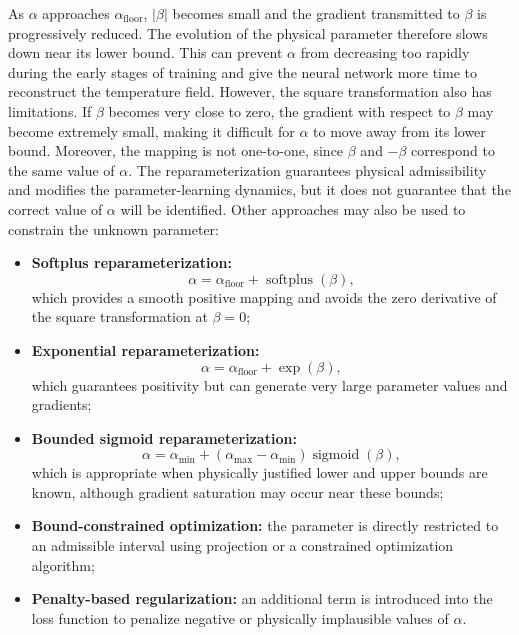 As $\alpha$ approaches $\alpha_{\mathrm{floor}}$, $\lvert\beta\rvert$ becomes
small and the gradient transmitted to $\beta$ is progressively reduced. The
evolution of the physical parameter therefore slows down near its lower bound.
This can prevent $\alpha$ from decreasing too rapidly during the early stages
of training and give the neural network more time to reconstruct the
temperature field. However, the square transformation also has limitations. If $\beta$ becomes
very close to zero, the gradient with respect to $\beta$ may become extremely
small, making it difficult for $\alpha$ to move away from its lower bound.
Moreover, the mapping is not one-to-one, since $\beta$ and $-\beta$ correspond
to the same value of $\alpha$. The reparameterization guarantees physical
admissibility and modifies the parameter-learning dynamics, but it does not
guarantee that the correct value of $\alpha$ will be identified. Other approaches may also be used to constrain the unknown parameter:

\begin{itemize}
    \item \textbf{Softplus reparameterization:}
    \begin{equation}
    \alpha
    =
    \alpha_{\mathrm{floor}}
    +
    \operatorname{softplus}(\beta),
    \end{equation}
    which provides a smooth positive mapping and avoids the zero derivative of
    the square transformation at $\beta=0$;

    \item \textbf{Exponential reparameterization:}
    \begin{equation}
    \alpha
    =
    \alpha_{\mathrm{floor}}
    +
    \exp(\beta),
    \end{equation}
    which guarantees positivity but can generate very large parameter values
    and gradients;

    \item \textbf{Bounded sigmoid reparameterization:}
    \begin{equation}
    \alpha
    =
    \alpha_{\min}
    +
    \left(\alpha_{\max}-\alpha_{\min}\right)
    \operatorname{sigmoid}(\beta),
    \end{equation}
    which is appropriate when physically justified lower and upper bounds are
    known, although gradient saturation may occur near these bounds;

    \item \textbf{Bound-constrained optimization:} the parameter is directly
    restricted to an admissible interval using projection or a constrained
    optimization algorithm;

    \item \textbf{Penalty-based regularization:} an additional term is introduced
    into the loss function to penalize negative or physically implausible values
    of $\alpha$.
\end{itemize}


